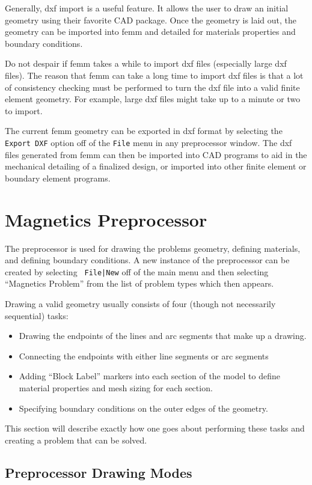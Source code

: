 \documentclass[12pt]{report}
\begin{document}
Generally, dxf import is a useful feature. It allows the user to
draw an initial geometry using their favorite CAD package. Once the
geometry is laid out, the geometry can be imported into femm and
detailed for materials properties and boundary conditions.

Do not despair if femm takes a while to import dxf files
(especially large dxf files). The reason that femm can take a long
time to import dxf files is that a lot of consistency checking must
be performed to turn the dxf file into a valid finite element
geometry. For example, large dxf files might take up to a minute or
two to import.

The current femm geometry can be exported in dxf format by
selecting the \texttt{Export DXF} option off of the \texttt{File}
menu in any preprocessor window. The dxf files generated from femm
can then be imported into CAD programs to aid in the mechanical
detailing of a finalized design, or imported into other finite
element or boundary element programs.

\section{Magnetics Preprocessor}

The preprocessor is used for drawing the problems geometry,
defining materials, and defining boundary conditions. A new
instance of the preprocessor can be created by selecting {\tt
File|New} off of the main menu and then selecting ``Magnetics
Problem'' from the list of problem types which then appears.

Drawing a valid geometry usually consists of four (though not
necessarily sequential) tasks:
\begin{itemize}
\item Drawing the endpoints of the lines and arc segments that
make up a drawing.
\item Connecting the endpoints with either line segments or arc
segments
\item Adding ``Block Label'' markers into each section of the
model to define material properties and mesh sizing for each
section.
\item Specifying boundary conditions on the outer edges of the
geometry.
\end{itemize}
This section will describe exactly how one goes about performing
these tasks and creating a problem that can be solved.

\subsection{Preprocessor Drawing Modes} \label{pencil}
\end{document}
